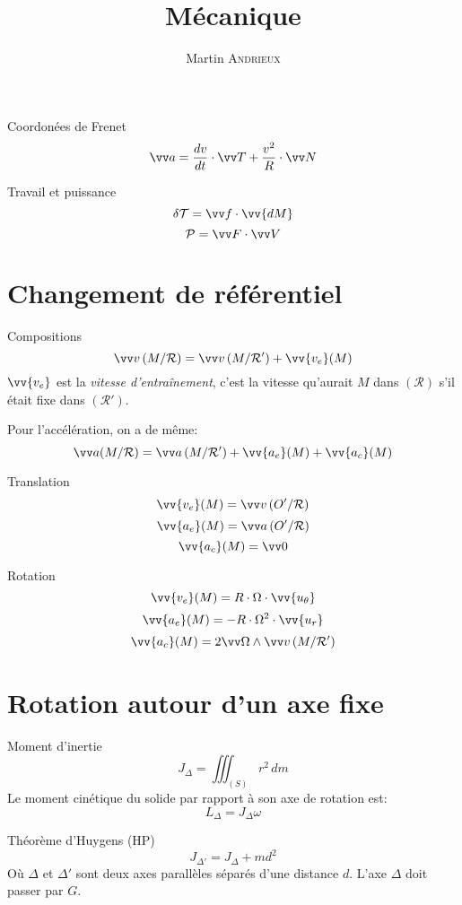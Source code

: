 \documentclass[french, a4paper, 11pt, twocolumn]{article}
\title{Mécanique}
\author{Martin \textsc{Andrieux}}
\date{}
\newcommand{\po}{\left(}         %
\newcommand{\pf}{\right)}        %
\newcommand{\pof}[1]{\po #1 \pf} %
\newcommand{\ur}{\vv{u_r}}          %
\newcommand{\uth}{\vv{u_\theta}}    %
\begin{document}
\maketitle

\begin{cadre}{Coordonées de Frenet}
  \[\vv a = \dfrac{dv}{dt}\cdot\vv T + \dfrac{v^{2}}{R}\cdot\vv N\]
\end{cadre}

\begin{cadre}{Travail et puissance}
  \[\delta\mathcal T = \vv f\cdot\vv{dM}\]
  \[\mathcal P = \vv F \cdot \vv V\]
\end{cadre}

\section{Changement de référentiel}
\begin{cadre}{Compositions}
  \[\vv v \pof{M/\mathcal R} = \vv v\pof{M/\mathcal R'} + \vv{v_{e}}(M)\]
  \(\vv{v_{e}}\) est la \emph{vitesse d'entraînement}, c'est la vitesse qu'aurait \(M\) dans \((\mathcal R)\) s'il était fixe dans \(\pof{\mathcal R'}\).

  Pour l'accélération, on a de même:
  \[\vv a(M/\mathcal R) = \vv a\pof{M/\mathcal R'} + \vv{a_{e}}(M) + \vv{a_{c}}(M)\]
\end{cadre}

\begin{cadre}{Translation}
  \[\vv{v_{e}}(M) = \vv v\pof{O'/\mathcal R}\]
  \[\vv{a_{e}}(M) = \vv a\pof{O'/\mathcal R}\]
  \[\vv{a_{c}}(M) = \vv 0\]
\end{cadre}

\begin{cadre}{Rotation}
  \[\vv{v_{e}}(M) = R\cdot\Omega\cdot\uth\]
  \[\vv{a_{e}}(M) = -R\cdot\Omega^{2}\cdot\ur\]
  \[\vv{a_{c}}(M) = 2\vv\Omega\wedge\vv v\pof{M/\mathcal R'}\]
\end{cadre}

\section{Rotation autour d'un axe fixe}
\begin{cadre}{Moment d'inertie}
  \[J_{\Delta} = \iiint_{(S)}r^{2}\,dm\]
  Le moment cinétique du solide par rapport à son axe de rotation est:
  \[L_{\Delta} = J_{\Delta}\omega\]
\end{cadre}

\begin{cadre}{Théorème d'Huygens (HP)}
  \[J_{\Delta'} = J_{\Delta} + md^{2}\]
  Où \(\Delta\) et \(\Delta'\) sont deux axes parallèles séparés d'une distance \(d\). L'axe \(\Delta\) doit passer par \(G\).
\end{cadre}
\end{document}
